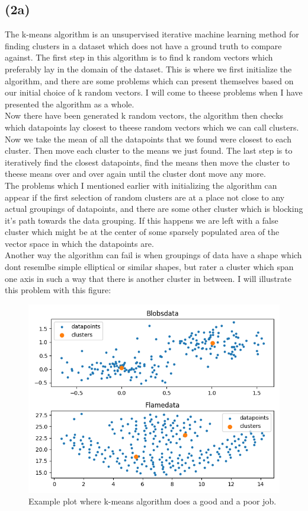 \documentclass[12pt, letterpaper]{article}
\begin{document}
    \subsection*{(2a)}
      The k-means algorithm is an unsupervised iterative machine learning method for finding clusters in a dataset which does not have a ground truth to compare against. The first step in this algorithm is to find k random vectors which preferably lay in the domain of the dataset. This is where we first initialize the algorithm, and there are some problems which can present themselves based on our initial choice of k random vectors. I will come to theese problems when I have presented the algorithm as a whole.\\
      Now there have been generated k random vectors, the algorithm then checks which datapoints lay closest to theese random vectors which we can call clusters. Now we take the mean of all the datapoints that we found were closest to each cluster. Then move each cluster to the means we just found. The last step is to iteratively find the closest datapoints, find the means then move the cluster to theese means over and over again until the cluster dont move any more.\\
      The problems which I mentioned earlier with initializing the algorithm can appear if the first selection of random clusters are at a place not close to any actual groupings of datapoints, and there are some other cluster which is blocking it's path towards the data grouping. If this happens we are left with a false cluster which might be at the center of some sparsely populated area of the vector space in which the datapoints are.\\
      Another way the algorithm can fail is when groupings of data have a shape which dont resemlbe simple elliptical or similar shapes, but rater a cluster which span one axis in such a way that there is another cluster in between. I will illustrate this problem with this figure:\\
      \begin{figure}[H]
        \caption{Example plot where k-means algorithm does a good and a poor job.}
        \centering
        \includegraphics[scale=0.69]{exampleplot}
      \end{figure}
\end{document}

